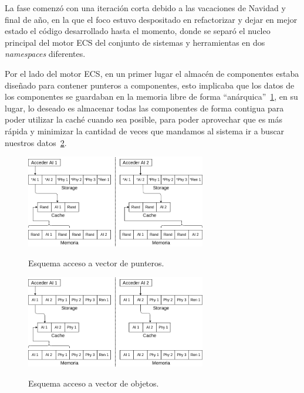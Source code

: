 La fase comenzó con una iteración corta debido a las vacaciones de Navidad y final de año, en la
que el foco estuvo despositado en refactorizar y dejar en mejor estado el código desarrollado
hasta el momento, donde se separó el nucleo principal del motor \ac{ECS} del conjunto de sistemas y
herramientas en dos \textit{namespaces} diferentes. 

Por el lado del motor \ac{ECS}, en un primer lugar el almacén de componentes estaba diseñado
para contener punteros a componentes, esto implicaba que los datos de los componentes se
guardaban en la memoria libre de forma ``anárquica''~\ref{fig:memoria_ptr}, 
en su lugar, lo deseado es almacenar todas las componentes de forma contigua para poder utilizar
la caché cuando sea posible, para poder aprovechar que es más rápida y minimizar la cantidad de
veces que mandamos al sistema ir a buscar nuestros datos~\ref{fig:memoria_obj}.

\begin{figure}[htb]
\centering
\includegraphics[width=0.7\textwidth]{imagenes/diario_desarrollo/memoria2.png}\\
\caption{Esquema acceso a vector de punteros.}
\label{fig:memoria_ptr}
\end{figure}

\begin{figure}[hbt]
\centering
\includegraphics[width=0.7\textwidth]{imagenes/diario_desarrollo/memoria1.png}\\
\caption{Esquema acceso a vector de objetos.}
\label{fig:memoria_obj}
\end{figure}

